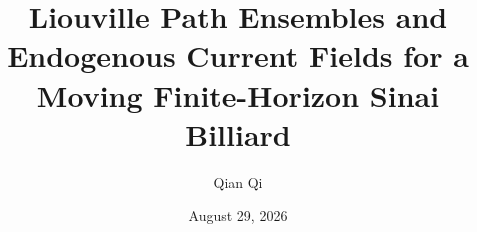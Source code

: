\documentclass[11pt,reqno]{amsart}
\title[Liouville path ensembles for a Sinai billiard]{Liouville Path Ensembles and Endogenous Current Fields for a Moving Finite-Horizon Sinai Billiard}
\author{Qian Qi}
\date{August 29, 2026}
\theoremstyle{definition}
\theoremstyle{remark}
\begin{document}
\raggedbottom




\end{document}
